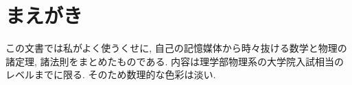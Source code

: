 \chapter*{まえがき}
この文書では私がよく使うくせに, 自己の記憶媒体から時々抜ける数学と物理の諸定理, 諸法則をまとめたものである. 内容は理学部物理系の大学院入試相当のレベルまでに限る. そのため数理的な色彩は淡い. 
